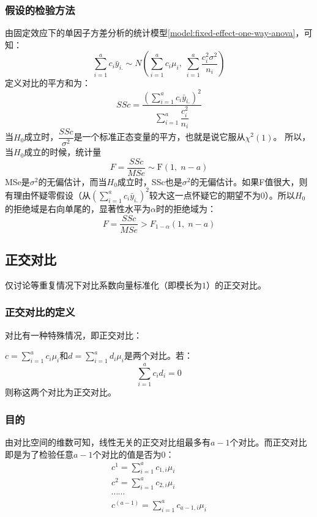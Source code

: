 \subsubsection{假设的检验方法}
由固定效应下的单因子方差分析的统计模型\cref{model:fixed-effect-one-way-anova}，可知：
\begin{equation*}
	\sum_{i=1}^ac_i\bar{y}_{i.}\sim N(\sum_{i=1}^ac_i\mu_i,\;\sum_{i=1}^a\frac{c_i^2\sigma^2}{n_i})
\end{equation*}
定义对比的平方和为：
\begin{equation*}
	SSc=\frac{\left(\sum\limits_{i=1}^ac_i\bar{y}_{i.}\right)^2}{\sum\limits_{i=1}^a\dfrac{c_i^2}{n_i}}
\end{equation*}
当$H_0$成立时，$\dfrac{SSc}{\sigma^2}$是一个标准正态变量的平方，也就是说它服从$\chi^2(1)$。
所以，当$H_0$成立的时候，统计量
\begin{equation*}
	F=\frac{SSc}{MSe}\sim\text{F}(1,\;n-a)
\end{equation*}
MSe是$\sigma^2$的无偏估计，而当$H_0$成立时，SSc也是$\sigma^2$的无偏估计。如果F值很大，则有理由怀疑零假设（从$\left(\sum\limits_{i=1}^ac_i\bar{y}_{i.}\right)^2$较大这一点怀疑它的期望不为$0$）。所以$H_0$的拒绝域是右向单尾的，显著性水平为$\alpha$时的拒绝域为：
\begin{equation*}
	F=\frac{SSc}{MSe}>F_{1-\alpha}(1,\;n-a)
\end{equation*}

\subsection{正交对比}
仅讨论等重复情况下对比系数向量标准化（即模长为$1$）的正交对比。
\subsubsection{正交对比的定义}
对比有一种特殊情况，即正交对比：
\begin{definition}
	$c=\sum\limits_{i=1}^ac_i\mu_i$和$d=\sum\limits_{i=1}^ad_i\mu_i$是两个对比。若：
	\begin{equation*}
		\sum_{i=1}^ac_id_i=0
	\end{equation*}
	则称这两个对比为正交对比。
\end{definition}
\subsubsection{目的}
由对比空间的维数可知，线性无关的正交对比组最多有$a-1$个对比。而正交对比即是为了检验任意$a-1$个对比的值是否为$0$：
\begin{gather*}
	c^1=\sum_{i=1}^ac_{1,i}\mu_i \\
	c^2=\sum_{i=1}^ac_{2,i}\mu_i \\
	\cdots\cdots \\
	c^{(a-1)}=\sum_{i=1}^ac_{a-1,i}\mu_i
\end{gather*}
